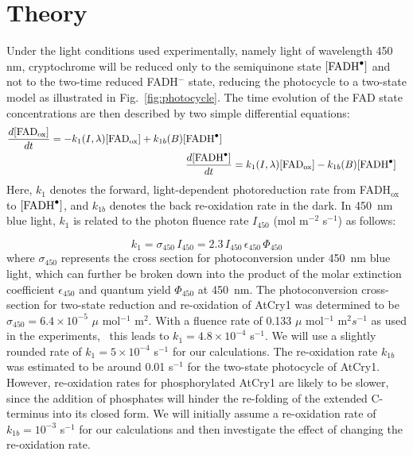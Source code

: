 \documentclass[twoside,twocolumn,9pt]{article}
\begin{document}
\section{Theory}
Under the light conditions used experimentally, namely light of wavelength 450 nm, \cite{Pooam2019, Hammad2019} cryptochrome will be reduced only to the semiquinone state $[\ce{FADH^{.}}]$ and not to the two-time reduced FADH$^-$ state, reducing the photocycle to a two-state model \cite{Procopio2016} as illustrated in Fig.~\ref{fig:photocycle}. The time evolution of the FAD state concentrations are then described by two simple differential equations:
\begin{subequations} \label{eq:ODE}
	\begin{align}
	\begin{split}
	\frac{d[\text{FAD}_{\text{ox}}]}{dt} & = -k_{1}(I, \lambda) [\text{FAD}_{\text{ox}}] + k_{1b}(B) [\ce{FADH^{.}}]
	\end{split} 			
	\\	
	\frac{d[\ce{FADH^{.}}]}{dt} & = k_{1}(I, \lambda) [\text{FAD}_{\text{ox}}] - k_{1b}(B) [\ce{FADH^{.}}]
	\end{align}
\end{subequations}
Here, $k_{1}$ denotes the forward, light-dependent photoreduction rate from FADH$_{\text{ox}}$ to $[\ce{FADH^{.}}]$, and $k_{1b}$ denotes the back re-oxidation rate in the dark. In 450~nm blue light, $k_{1}$ is related to the photon fluence rate $I_{450}$ (mol m$^{-2}$ s$^{-1}$) as follows: \cite{Kendrick94}

\begin{equation}
	k_{1} = \sigma_{450} \, I_{450} = 2.3 \, I_{450} \, \epsilon_{450} \, \Phi_{450}
\end{equation}
where $\sigma_{450}$ represents the cross section for photoconversion under 450~nm blue light, which can further be broken down into the product of the molar extinction coefficient $\epsilon_{450}$ and quantum yield $\Phi_{450}$ at 450~nm. The photoconversion cross-section for two-state reduction and re-oxidation of AtCry1 was determined to be $\sigma_{450} = 6.4 \times 10^{-5}$ $\mu$ mol$^{-1}$ m$^{2}$. With a fluence rate of 0.133 $\mu$ mol$^{-1}$ m$^{2} s^{-1}$ as used in the experiments,~\cite{Hammad2019} this leads to $k_{1} = 4.8 \times 10^{-4}$ s$^{-1}$. We will use a slightly rounded rate of $k_{1} = 5 \times 10^{-4}$ s$^{-1}$ for our calculations. The re-oxidation rate $k_{1b}$ was estimated to be around 0.01 s$^{-1}$ for the two-state photocycle of AtCry1. \cite{Procopio2016} However, re-oxidation rates for phosphorylated AtCry1 are likely to be slower, since the addition of phosphates will hinder the re-folding of the extended C-terminus into its closed form. We will initially assume a re-oxidation rate of $k_{1b} = 10^{-3}$ s$^{-1}$ for our calculations and then investigate the effect of changing the re-oxidation rate.
\end{document}
